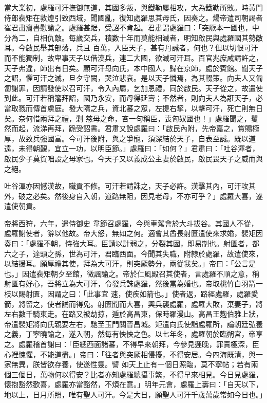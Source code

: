 \begin{pinyinscope}
 當大業初，處羅可汗撫御無道，其國多叛，與鐵勒屢相攻，大為鐵勒所敗。時黃門侍郎裴矩在敦煌引致西域，聞國亂，復知處羅思其母氏，因奏之。煬帝遣司朝謁者崔君肅齎書慰諭之。處羅甚踞，受詔不肯起。君肅謂處羅曰：「突厥本一國也，中分為二，自相仇敵。每歲交兵，積數十年而莫能相滅者，明知啟民與處羅國其勢敵耳。今啟民舉其部落，兵且
 百萬，入臣天子，甚有丹誠者，何也？但以切恨可汗而不能獨制，故卑事天子以借漢兵，連二大國，欲滅可汗耳。百官兆庶咸請許之，天子弗違，師出有日矣。顧可汗母向氏，本中國人，歸在京師，處於賓館。聞天子之詔，懼可汗之滅，旦夕守闕，哭泣悲哀。是以天子憐焉，為其輟策。向夫人又匍匐謝罪，因請發使以召可汗，令入內屬，乞加恩禮，同於啟民。天子從之，故遣使到此。可汗若稱籓拜詔，國乃永安，而母得延壽；不然者，則向夫人為誑天子，必當取戮而傳首虜庭。發大隋之兵，資北蕃之眾，左提右挈，以擊可汗，死亡則無日矣。奈何惜兩拜之禮，剿
 慈母之命，吝一句稱臣，喪匈奴國也！」處羅聞之，矍然而起，流涕再拜，跪受詔書。君肅又說處羅曰：「啟民內附，先帝嘉之，賞賜極厚，故致兵強國富。今可汗後附，與之爭寵，須深結於天子，自表至誠。既以道遠，未得朝覲，宜立一功，以明臣節。」處羅曰：「如何？」君肅曰：「吐谷渾者，啟民少子莫賀咄設之母家也。今天子又以義成公主妻於啟民，啟民畏天子之威而與之絕。



 吐谷渾亦因憾漢故，職貢不修。可汗若請誅之，天子必許。漢擊其內，可汗攻其外，破之必矣。然後身自入朝，道路無阻，因見老母，不亦可乎？」處羅大喜，遂遣使朝貢。



 帝將西狩，六年，遣侍御史
 韋節召處羅，今與車駕會於大斗拔谷。其國人不從，處羅謝使者，辭以他故。帝大怒，無如之何。適會其酋長射匱遣使來求婚，裴矩因奏曰：「處羅不朝，恃強大耳。臣請以計弱之，分裂其國，即易制也。射匱者，都六之子，達頭之孫，世為可汗，君臨西面。今聞其失職，附隸於處羅，故遣使來，以結援耳。願厚禮其使，拜為大可汗，則突厥勢分，兩從我矣。」帝曰：「公言是也。」因遣裴矩朝夕至館，微諷諭之。帝於仁風殿召其使者，言處羅不順之意，稱射匱有好心，吾將立為大可汗，令發兵誅處羅，然後當為婚也。帝取桃竹白羽箭一枝以賜射匱，因謂之曰：「此事宜
 速，使疾如箭也。」使者返，路經處羅，處羅愛箭，將留之，使者譎而得免。射匱聞而大喜，興兵襲處羅，處羅大敗，棄妻子，將左右數千騎東走。在路又被劫掠，遁於高昌東，保時羅漫山。高昌王麴伯雅上狀，帝遣裴矩將向氏親要左右，馳至玉門關晉昌城。矩遣向氏使詣處羅所，論朝廷弘養之義，丁寧曉諭之，遂入朝，然每有怏怏之色。以七年冬，處羅朝於臨朔宮，帝享之。處羅稽首謝曰：「臣總西面諸蕃，不得早來朝拜，今參見遲晚，罪責極深，臣心裡悚懼，不能道盡。」帝曰：「往者與突厥相侵擾，不得安居。今四海既清，與一家無異，朕皆欲存養，使遂性靈。譬
 如天上止有一個日照臨，莫不寧帖；若有兩個三個日，萬物何以得安？比者亦知處羅總攝事繁，不得早來相見。今日見處羅，懷抱豁然歡喜，處羅亦當豁然，不煩在意。」明年元會，處羅上壽曰：「自天以下，地以上，日月所照，唯有聖人可汗。今是大日，願聖人可汗千歲萬歲常如今日也。」




\end{pinyinscope}
